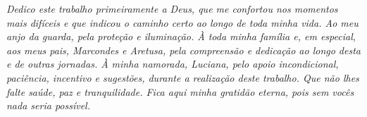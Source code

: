 \begin{titlepage}

\vspace*{\fill}

\hfill
\begin{minipage}{0.5\linewidth}
\begin{flushright}
\large\it
Dedico este trabalho primeiramente a Deus, que me confortou nos momentos mais
difíceis e que indicou o caminho certo ao longo de toda minha vida. Ao meu anjo
da guarda, pela proteção e iluminação. À toda minha família e, em especial, aos
meus pais, Marcondes e Aretusa, pela compreensão e dedicação ao longo desta e de
outras jornadas. À minha namorada, Luciana, pelo apoio incondicional, paciência,
incentivo e sugestões, durante a realização deste trabalho. Que não lhes falte
saúde, paz e tranquilidade. Fica aqui minha gratidão eterna, pois sem vocês nada
seria possível.
\end{flushright}
\end{minipage}

\vspace*{\fill}

\end{titlepage}

